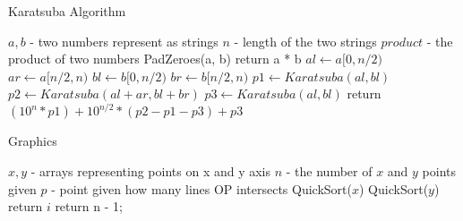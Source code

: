 \documentclass[10pt]{article}
\begin{document}
\begin{fullwidth}[width=\linewidth+4cm,leftmargin=-2cm,rightmargin=-2cm] 



\begin{algorithm}[H]
  \caption{Karatsuba Algorithm}
  \begin{algorithmic}[1]
    \Require $a, b$ - two numbers represent as strings
    \Require $n$ - length of the two strings
    \Ensure $product$ - the product of two numbers
      \State PadZeroes(a, b)  
        
        \State return a * b
      \EndIf
      \State $al \gets a[0,n/2)$    
      \State $ar \gets a[n/2,n)$    
      \State $bl \gets b[0,n/2)$    
      \State $br \gets b[n/2,n)$    
      \State $p1 \gets Karatsuba(al, bl)$
      \State $p2 \gets Karatsuba(al + ar, bl + br)$
      \State $p3 \gets Karatsuba(al, bl)$ 
      \State return $(10^n * p1) + 10^{n/2}*(p2 - p1 - p3) + p3$
  
    \EndProcedure
  \end{algorithmic}
\end{algorithm}


\begin{algorithm}[H]
  \caption{Graphics}
  \begin{algorithmic}[1]
    \Require $x, y$ - arrays representing points on x and y axis
    \Require $n$ - the number of $x$ and $y$ points given
    \Require $p$ - point given
    \Ensure how many lines OP intersects
      \State QuickSort($x$)
      \State QuickSort($y$)
         
          \State return $i$
        \EndIf
      \EndFor
      \State return n - 1; 
    \EndProcedure
  \end{algorithmic}
\end{algorithm}


\end{fullwidth}
\end{document}
